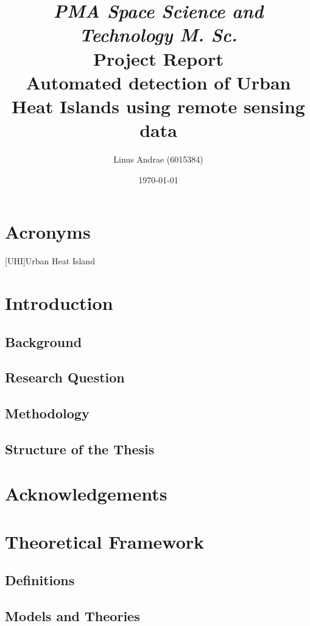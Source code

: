 \documentclass[a4paper, english]{article}
\title{\textit{PMA Space Science and Technology M. Sc.} \\ \vspace{1cm}Project Report \\ \vspace{1cm} \textbf{\huge Automated detection of Urban Heat Islands using remote sensing data}\\ \vspace{1.2cm} }
\author{Linus Andrae (6015384)}
\date{\today}
\begin{document}

\newpage

\newpage
\tableofcontents
\listoffigures
\listoftables
\section*{Acronyms}
\begin{acronym}
  [UHI]{Urban Heat Island}
\end{acronym}
\newpage

\section{Introduction}
    \subsection{Background}
   
    \subsection{Research Question}
    \subsection{Methodology}
    \subsection{Structure of the Thesis}

\section*{Acknowledgements}

\section{Theoretical Framework}
    \subsection{Definitions}
    
    \subsection{Models and Theories}
\end{document}
